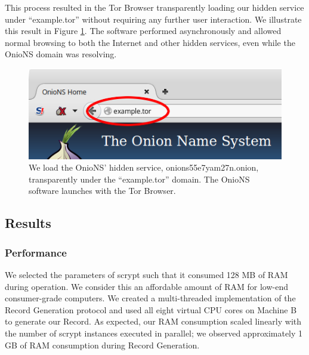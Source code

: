 \documentclass[conference]{IEEEtran}
\begin{document}
This process resulted in the Tor Browser transparently loading our hidden service under ``example.tor'' without requiring any further user interaction. We illustrate this result in Figure \ref{fig:prototypeExample}. The software performed asynchronously and allowed normal browsing to both the Internet and other hidden services, even while the OnioNS domain was resolving.


\begin{figure}[h]
	\centering
	\includegraphics[width=0.95\linewidth]{../assets/images/example.png}
	\caption{We load the OnioNS' hidden service, onions55e7yam27n.onion, transparently under the ``example.tor'' domain. The OnioNS software launches with the Tor Browser.}
	\label{fig:prototypeExample}
\end{figure}

\subsection{Results}

\subsubsection{Performance}

We selected the parameters of scrypt such that it consumed 128 MB of RAM during operation. We consider this an affordable amount of RAM for low-end consumer-grade computers. We created a multi-threaded implementation of the Record Generation protocol and used all eight virtual CPU cores on Machine B to generate our Record. As expected, our RAM consumption scaled linearly with the number of scrypt instances executed in parallel; we observed approximately 1 GB of RAM consumption during Record Generation. 
\end{document}
